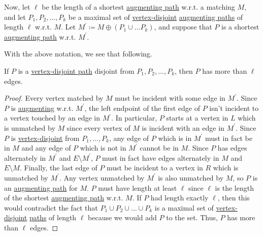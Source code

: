 Now, let \(\ell \) be the length of a shortest \hyperref[def:augmenting-path]{augmenting path} w.r.t. a matching \(M\), and let \(P_1, P_2, \ldots  , P_k\)
be a maximal set of \hyperref[def:vertex-independent]{vertex-disjoint} \hyperref[def:augmenting-path]{augmenting paths} of length \(\ell \) w.r.t. \(M\).
Let \(M^\prime \coloneqq M\oplus (P_1 \cup \ldots P_k )\), and suppose that \(P\) is a shortest \hyperref[def:augmenting-path]{augmenting path} w.r.t. \(M^\prime \).

With the above notation, we see that following.

\begin{lemma}\label{lma:lec25-3}
	If \(P\) is a \hyperref[def:vertex-independent]{vertex-disjoint path} disjoint from \(P_1, P_2, \ldots , P_k \), then \(P\) has more than \(\ell \)
	edges.
\end{lemma}
\begin{proof}
	Every vertex matched by \(M\) must be incident with some edge in \(M^\prime \). Since \(P\) is \hyperref[def:augmenting-path]{augmenting} w.r.t. \(M^\prime \),
	the left endpoint of the first edge of \(P\) isn't incident to a vertex touched by an edge in \(M^\prime \). In particular, \(P\) starts at a vertex in \(L\)
	which is unmatched by \(M\) since every vertex of \(M\) is incident with an edge in \(M^\prime \). Since \(P\) is \hyperref[def:vertex-independent]{vertex-disjoint}
	from \(P_1, \ldots  , P_k\), any edge of \(P\) which is in \(M^\prime \) must in fact be in \(M\) and any edge of \(P\) which is not in \(M^\prime \)
	cannot be in \(M\). Since \(P\) has edges alternately in \(M^\prime \) and \(E \setminus M^\prime \), \(P\) must in fact have edges alternately in \(M\) and
	\(E \setminus M\). Finally, the last edge of \(P\) must be incident to a vertex in \(R\) which is unmatched by \(M^\prime \). Any vertex unmatched by \(M^\prime \)
	is also unmatched by \(M\), so \(P\) is an \hyperref[def:augmenting-path]{augmenting path} for \(M\). \(P\) must have length at least \(\ell \) since \(\ell \)
	is the length of the shortest \hyperref[def:augmenting-path]{augmenting path} w.r.t. \(M\). If \(P\) had length exactly \(\ell \), then this would contradict the fact that
	\(P_1 \cup P_2 \cup \ldots  \cup P_k\) is a maximal set of \hyperref[def:vertex-independent]{vertex-disjoint} \hyperref[def:path]{paths} of length \(\ell \)
	because we would add \(P\) to the set. Thus, \(P\) has more than \(\ell \) edges.
\end{proof}


